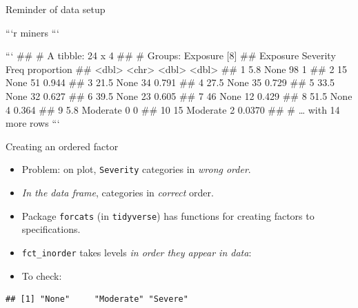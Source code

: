 \documentclass[ignorenonframetext,]{beamer}
\newenvironment{Shaded}{\begin{snugshade}}{\end{snugshade}}
\newcommand{\DataTypeTok}[1]{\textcolor[rgb]{0.13,0.29,0.53}{#1}}
\newcommand{\KeywordTok}[1]{\textcolor[rgb]{0.13,0.29,0.53}{\textbf{#1}}}
\newcommand{\NormalTok}[1]{#1}
\newcommand{\OperatorTok}[1]{\textcolor[rgb]{0.81,0.36,0.00}{\textbf{#1}}}
\newcommand{\StringTok}[1]{\textcolor[rgb]{0.31,0.60,0.02}{#1}}
\providecommand{\tightlist}{%
  \setlength{\itemsep}{0pt}\setlength{\parskip}{0pt}}
\begin{document}
\begin{frame}{Reminder of data setup}
\protect\hypertarget{reminder-of-data-setup}{}

\begin{footnotesize}

```r
miners
```

```
## # A tibble: 24 x 4
## # Groups:   Exposure [8]
##    Exposure Severity  Freq proportion
##       <dbl> <chr>    <dbl>      <dbl>
##  1      5.8 None        98     1     
##  2     15   None        51     0.944 
##  3     21.5 None        34     0.791 
##  4     27.5 None        35     0.729 
##  5     33.5 None        32     0.627 
##  6     39.5 None        23     0.605 
##  7     46   None        12     0.429 
##  8     51.5 None         4     0.364 
##  9      5.8 Moderate     0     0     
## 10     15   Moderate     2     0.0370
## # … with 14 more rows
```

   
\end{footnotesize}

\end{frame}

\begin{frame}[fragile]{Creating an ordered factor}
\protect\hypertarget{creating-an-ordered-factor}{}

\begin{itemize}
\item
  Problem: on plot, \texttt{Severity} categories in \emph{wrong
  order}.
\item
  \emph{In the data frame}, categories in \emph{correct} order.
\item
  Package \texttt{forcats} (in \texttt{tidyverse}) has functions for
  creating factors to specifications.
\item
  \texttt{fct\_inorder} takes levels \emph{in order they appear in
  data}:
\end{itemize}

\begin{Shaded}
\end{Shaded}

\begin{itemize}
\tightlist
\item
  To check:
\end{itemize}

\begin{Shaded}
\end{Shaded}

\begin{verbatim}
## [1] "None"     "Moderate" "Severe"
\end{verbatim}

\end{frame}
\end{document}
